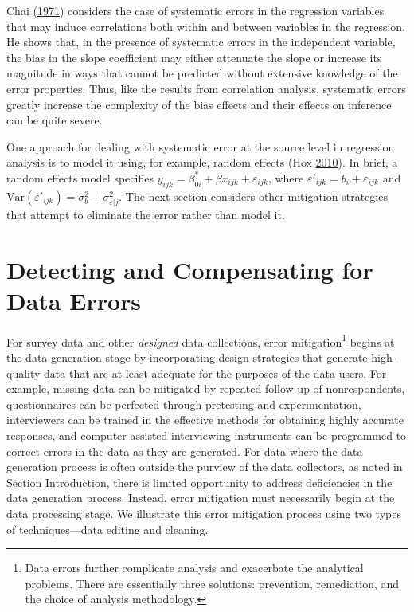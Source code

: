 \documentclass[]{krantz}
\begin{document}
Chai (\protect\hyperlink{ref-chai1971correlated}{1971}) considers the
case of systematic errors in the regression variables that may induce
correlations both within and between variables in the regression. He
shows that, in the presence of systematic errors in the independent
variable, the bias in the slope coefficient may either attenuate the
slope or increase its magnitude in ways that cannot be predicted without
extensive knowledge of the error properties. Thus, like the results from
correlation analysis, systematic errors greatly increase the complexity
of the bias effects and their effects on inference can be quite severe.

One approach for dealing with systematic error at the source level in
regression analysis is to model it using, for example, random effects
(Hox \protect\hyperlink{ref-hox2010multilevel}{2010}). In brief, a
random effects model specifies
\(y_{ijk} = \beta_{0i}^\ast + \beta x_{ijk} + \varepsilon_{ijk}\), where
\({\varepsilon }'_{ijk} = b_i + \varepsilon_{ijk}\) and
\(\mathrm{Var}({\varepsilon }'_{ijk} ) = \sigma_b^2 + \sigma_{\varepsilon \vert j}^2\).
The next section considers other mitigation strategies that attempt to
eliminate the error rather than model it.

\section{Detecting and Compensating for Data Errors}\label{sec:10-5}

For survey data and other \emph{designed} data collections, error
mitigation\footnote{Data errors further complicate analysis and
  exacerbate the analytical problems. There are essentially three
  solutions: prevention, remediation, and the choice of analysis
  methodology.} begins at the data generation stage by incorporating
design strategies that generate high-quality data that are at least
adequate for the purposes of the data users. For example, missing data
can be mitigated by repeated follow-up of nonrespondents, questionnaires
can be perfected through pretesting and experimentation, interviewers
can be trained in the effective methods for obtaining highly accurate
responses, and computer-assisted interviewing instruments can be
programmed to correct errors in the data as they are generated. For data
where the data generation process is often outside the purview of the
data collectors, as noted in Section
\protect\hyperlink{sec:10-1}{Introduction}, there is limited opportunity
to address deficiencies in the data generation process. Instead, error
mitigation must necessarily begin at the data processing stage. We
illustrate this error mitigation process using two types of
techniques---data editing and cleaning.
\end{document}
